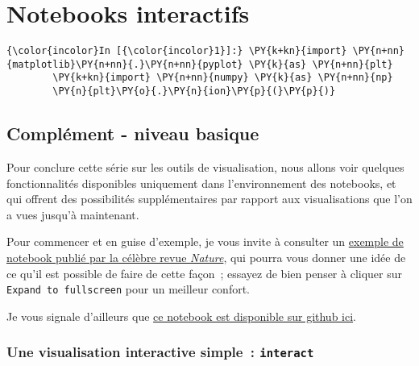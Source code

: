     
    
    
    

    

    \hypertarget{notebooks-interactifs}{%
\section{Notebooks interactifs}\label{notebooks-interactifs}}

    \begin{Verbatim}[commandchars=\\\{\},frame=single,framerule=0.3mm,rulecolor=\color{cellframecolor}]
{\color{incolor}In [{\color{incolor}1}]:} \PY{k+kn}{import} \PY{n+nn}{matplotlib}\PY{n+nn}{.}\PY{n+nn}{pyplot} \PY{k}{as} \PY{n+nn}{plt}
        \PY{k+kn}{import} \PY{n+nn}{numpy} \PY{k}{as} \PY{n+nn}{np}
        \PY{n}{plt}\PY{o}{.}\PY{n}{ion}\PY{p}{(}\PY{p}{)}
\end{Verbatim}


    \hypertarget{compluxe9ment---niveau-basique}{%
\subsection{Complément - niveau
basique}\label{compluxe9ment---niveau-basique}}

    Pour conclure cette série sur les outils de visualisation, nous allons
voir quelques fonctionnalités disponibles uniquement dans
l'environnement des notebooks, et qui offrent des possibilités
supplémentaires par rapport aux visualisations que l'on a vues jusqu'à
maintenant.

    Pour commencer et en guise d'exemple, je vous invite à consulter un
\href{http://www.nature.com/news/ipython-interactive-demo-7.21492}{exemple
de notebook publié par la célèbre revue \emph{Nature}}, qui pourra vous
donner une idée de ce qu'il est possible de faire de cette façon~;
essayez de bien penser à cliquer sur \texttt{Expand\ to\ fullscreen}
pour un meilleur confort.

Je vous signale d'ailleurs que
\href{https://github.com/jupyter/nature-demo}{ce notebook est disponible
sur github ici}.

    \hypertarget{une-visualisation-interactive-simple-interact}{%
\subsubsection{\texorpdfstring{Une visualisation interactive simple~:
\texttt{interact}}{Une visualisation interactive simple~: interact}}\label{une-visualisation-interactive-simple-interact}}

